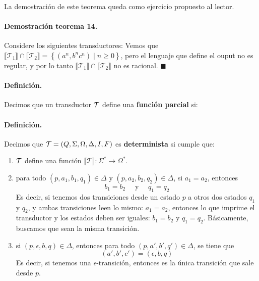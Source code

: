La demostración de este teorema queda como ejercicio propuesto al lector.

\paragraph{Demostración teorema 14.} Considere los siguientes transductores:
Vemos que $\llbracket \mathcal{T}_1 \rrbracket \cap \llbracket \mathcal{T}_2 \rrbracket=\left\{\left(a^n, b^n c^n\right) \mid n \geq 0\right\}$, pero el lenguaje que define el ouput no es regular, y por lo tanto $\llbracket \mathcal{T}_1 \rrbracket \cap \llbracket \mathcal{T}_2 \rrbracket$ no es racional. \hfill $\blacksquare$

\paragraph{Definición.} Decimos que un transductor $\mathcal{T}$ define una \textbf{función parcial} si:

\paragraph{Definición.} Decimos que $\mathcal{T}=(Q,\Sigma,\Omega,\Delta,I,F)$ es \textbf{determinista} si cumple que:
\begin{enumerate}
    \item $\mathcal{T}$ define una función $\llbracket \mathcal{T} \rrbracket: \Sigma^* \rightarrow \Omega^*$.
    \item para todo $(p,a_1,b_1,q_1)\in\Delta$ y $(p,a_2,b_2,q_2)\in \Delta$, si $a_1=a_2$, entonces
          $$
              b_1=b_2 \quad\text{ y }\quad q_1=q_2
          $$
          Es decir, si tenemos dos transiciones desde un estado $p$ a otros dos estados $q_1$ y $q_2$, y ambas transiciones leen lo mismo: $a_1=a_2$, entonces lo que imprime el transductor y los estados deben ser iguales: $b_1=b_2$ y $q_1=q_2$. Básicamente, buscamos que sean la misma transición.
    \item si $(p,\epsilon,b,q) \in \Delta$, entonces para todo $(p,a',b',q')\in\Delta$, se tiene que
          $$
              (a',b',c')=(\epsilon,b,q)
          $$
          Es decir, si tenemos una $\epsilon$-transición, entonces es la única transición que sale desde $p$.
\end{enumerate}

